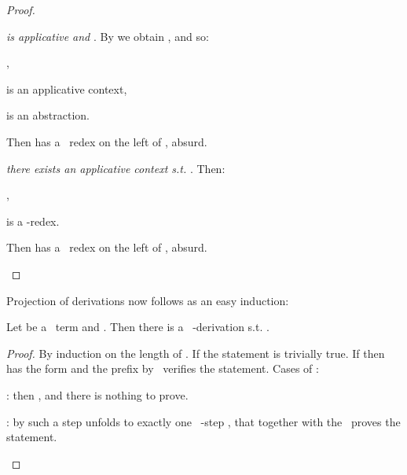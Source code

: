 \begin{proof}
\begin{varenumerate}
\begin{varenumerate}
		\begin{varenumerate}
			\item \emph{ is applicative and }. By  we obtain , and so:
			\begin{varenumerate}
				\item ,
				
				\item  is an applicative context,
				
				\item  is an abstraction.
			\end{varenumerate}
			Then  has a \opt\ redex on the left of , absurd.
			
			\item \emph{there exists an applicative context  s.t. }. Then:
			\begin{varenumerate}
				\item ,
				
				\item  is a -redex.
			\end{varenumerate}
			Then  has a \opt\ redex on the left of , absurd.
		\end{varenumerate}
	\end{varenumerate}
	
\end{varenumerate}
\end{proof}


Projection of derivations now follows as an easy induction:

\begin{theorem}[Projection]
	\label{tm:projection}
	Let  be a \lsc\ term and . Then there is a \lo\ -derivation  s.t. .
\end{theorem}


\begin{proof}
	 By induction on the length  of . If  the statement is trivially true. If  then  has the form  and the prefix  by \ih\ verifies the statement. Cases of :
	\begin{varenumerate}
		\item : then , and there is nothing to prove. 
			
		\item : by  such a step unfolds to exactly one \lo\ -step , that together with the \ih\ proves the statement.
	\end{varenumerate}
\end{proof}


